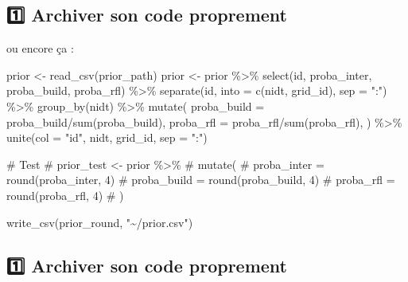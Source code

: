 \documentclass[
  letterpaper,
  DIV=11,
  numbers=noendperiod]{scrartcl}
\newenvironment{Shaded}{\begin{snugshade}}{\end{snugshade}}
\newcommand{\BuiltInTok}[1]{\textcolor[rgb]{0.00,0.23,0.31}{#1}}
\newcommand{\CommentTok}[1]{\textcolor[rgb]{0.37,0.37,0.37}{#1}}
\newcommand{\NormalTok}[1]{\textcolor[rgb]{0.00,0.23,0.31}{#1}}
\newcommand{\OperatorTok}[1]{\textcolor[rgb]{0.37,0.37,0.37}{#1}}
\newcommand{\StringTok}[1]{\textcolor[rgb]{0.13,0.47,0.30}{#1}}
\begin{document}
\hypertarget{archiver-son-code-proprement-2}{%
\subsection{\texorpdfstring{{1️⃣} Archiver son code
proprement}{1️⃣ Archiver son code proprement}}\label{archiver-son-code-proprement-2}}

ou encore ça :

\begin{Shaded}
\begin{Highlighting}[numbers=left,,]
\NormalTok{prior }\OperatorTok{\textless{}{-}}\NormalTok{ read\_csv(prior\_path)}
\NormalTok{prior }\OperatorTok{\textless{}{-}}\NormalTok{ prior }\OperatorTok{\%\textgreater{}\%}
\NormalTok{    select(}\BuiltInTok{id}\NormalTok{, proba\_inter, proba\_build, proba\_rfl) }\OperatorTok{\%\textgreater{}\%}
\NormalTok{    separate(}\BuiltInTok{id}\NormalTok{, into }\OperatorTok{=}\NormalTok{ c(}\StringTok{\textquotesingle{}nidt\textquotesingle{}}\NormalTok{, }\StringTok{\textquotesingle{}grid\_id\textquotesingle{}}\NormalTok{), sep }\OperatorTok{=} \StringTok{":"}\NormalTok{) }\OperatorTok{\%\textgreater{}\%}
\NormalTok{    group\_by(nidt) }\OperatorTok{\%\textgreater{}\%}
\NormalTok{    mutate(}
\NormalTok{        proba\_build }\OperatorTok{=}\NormalTok{ proba\_build}\OperatorTok{/}\BuiltInTok{sum}\NormalTok{(proba\_build),}
\NormalTok{        proba\_rfl }\OperatorTok{=}\NormalTok{ proba\_rfl}\OperatorTok{/}\BuiltInTok{sum}\NormalTok{(proba\_rfl),}
\NormalTok{        ) }\OperatorTok{\%\textgreater{}\%}
\NormalTok{    unite(col }\OperatorTok{=} \StringTok{"id"}\NormalTok{, nidt, grid\_id, sep }\OperatorTok{=} \StringTok{":"}\NormalTok{)}

\CommentTok{\# Test}
\CommentTok{\# prior\_test \textless{}{-} prior \%\textgreater{}\%}
\CommentTok{\#    mutate(}
\CommentTok{\#        proba\_inter = round(proba\_inter, 4)}
\CommentTok{\#        proba\_build = round(proba\_build, 4)}
\CommentTok{\#        proba\_rfl = round(proba\_rfl, 4)}
\CommentTok{\#    )}

\NormalTok{write\_csv(prior\_round, }\StringTok{"\textasciitilde{}/prior.csv"}\NormalTok{)}
\end{Highlighting}
\end{Shaded}

\hypertarget{archiver-son-code-proprement-3}{%
\subsection{\texorpdfstring{{1️⃣} Archiver son code
proprement}{1️⃣ Archiver son code proprement}}\label{archiver-son-code-proprement-3}}
\end{document}
